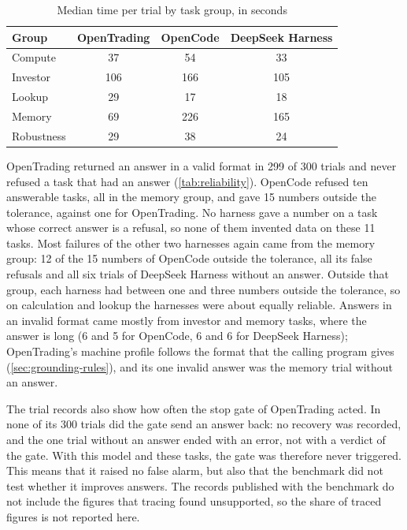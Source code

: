 \begin{table}[H]
  \centering
  \caption{Median time per trial by task group, in seconds}\label{tab:speed-group}
  \begin{tabularx}{\textwidth}{@{}L *{3}{S[table-format=3.0]}@{}}
    \toprule
    {Group} & {OpenTrading} & {OpenCode} & {DeepSeek Harness}\\
    \midrule
    Compute & 37 & 54 & 33\\
    Investor & 106 & 166 & 105\\
    Lookup & 29 & 17 & 18\\
    Memory & 69 & 226 & 165\\
    Robustness & 29 & 38 & 24\\
    \bottomrule
  \end{tabularx}
\end{table}

\label{sec:reliability}
OpenTrading returned an answer in a valid format in 299 of 300 trials and never refused a task that had an answer (\cref{tab:reliability}).
OpenCode refused ten answerable tasks, all in the memory group, and gave 15 numbers outside the tolerance, against one for OpenTrading.
No harness gave a number on a task whose correct answer is a refusal, so none of them invented data on these 11 tasks.
Most failures of the other two harnesses again came from the memory group: 12 of the 15 numbers of OpenCode outside the tolerance, all its false refusals and all six trials of DeepSeek Harness without an answer.
Outside that group, each harness had between one and three numbers outside the tolerance, so on calculation and lookup the harnesses were about equally reliable.
Answers in an invalid format came mostly from investor and memory tasks, where the answer is long (6 and 5 for OpenCode, 6 and 6 for DeepSeek Harness); OpenTrading's machine profile follows the format that the calling program gives (\cref{sec:grounding-rules}), and its one invalid answer was the memory trial without an answer.

The trial records also show how often the stop gate of OpenTrading acted.
In none of its 300 trials did the gate send an answer back: no recovery was recorded, and the one trial without an answer ended with an error, not with a verdict of the gate.
With this model and these tasks, the gate was therefore never triggered.
This means that it raised no false alarm, but also that the benchmark did not test whether it improves answers.
The records published with the benchmark do not include the figures that tracing found unsupported, so the share of traced figures is not reported here.

